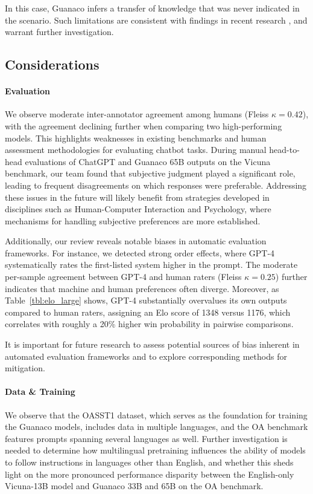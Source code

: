 In this case, {Guanaco} infers a transfer of knowledge that was never indicated in the scenario. Such limitations are consistent with findings in recent research \cite{sap2022neural}, and warrant further investigation.

\subsection{Considerations}
\label{ssec:considerations}

\paragraph{Evaluation}

We observe moderate inter-annotator agreement among humans (Fleiss $\kappa=0.42$), with the agreement declining further when comparing two high-performing models. This highlights weaknesses in existing benchmarks and human assessment methodologies for evaluating chatbot tasks. During manual head-to-head evaluations of ChatGPT and {Guanaco} 65B outputs on the Vicuna benchmark, our team found that subjective judgment played a significant role, leading to frequent disagreements on which responses were preferable. Addressing these issues in the future will likely benefit from strategies developed in disciplines such as Human-Computer Interaction and Psychology, where mechanisms for handling subjective preferences are more established.

Additionally, our review reveals notable biases in automatic evaluation frameworks. For instance, we detected strong order effects, where GPT-4 systematically rates the first-listed system higher in the prompt. The moderate per-sample agreement between GPT-4 and human raters (Fleiss $\kappa=0.25$) further indicates that machine and human preferences often diverge. Moreover, as Table~\ref{tbl:elo_large} shows, GPT-4 substantially overvalues its own outputs compared to human raters, assigning an Elo score of 1348 versus 1176, which correlates with roughly a 20\% higher win probability in pairwise comparisons.

It is important for future research to assess potential sources of bias inherent in automated evaluation frameworks and to explore corresponding methods for mitigation.

\paragraph{Data \& Training} We observe that the OASST1 dataset, which serves as the foundation for training the {Guanaco} models, includes data in multiple languages, and the OA benchmark features prompts spanning several languages as well. Further investigation is needed to determine how multilingual pretraining influences the ability of models to follow instructions in languages other than English, and whether this sheds light on the more pronounced performance disparity between the English-only Vicuna-13B model and {Guanaco} 33B and 65B on the OA benchmark.

